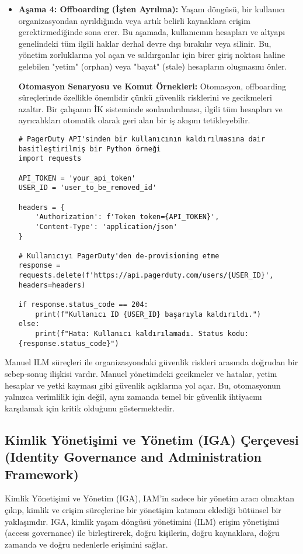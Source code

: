 \begin{itemize}
    \item \textbf{Aşama 4: Offboarding (İşten Ayrılma):} Yaşam döngüsü, bir kullanıcı organizasyondan ayrıldığında veya artık belirli kaynaklara erişim gerektirmediğinde sona erer. Bu aşamada, kullanıcının hesapları ve altyapı genelindeki tüm ilgili haklar derhal devre dışı bırakılır veya silinir. Bu, yönetim zorluklarına yol açan ve saldırganlar için birer giriş noktası haline gelebilen "yetim" (orphan) veya "bayat" (stale) hesapların oluşmasını önler.

    \textbf{Otomasyon Senaryosu ve Komut Örnekleri:} Otomasyon, offboarding süreçlerinde özellikle önemlidir çünkü güvenlik risklerini ve gecikmeleri azaltır. Bir çalışanın İK sisteminde sonlandırılması, ilgili tüm hesapları ve ayrıcalıkları otomatik olarak geri alan bir iş akışını tetikleyebilir.
\begin{verbatim}
# PagerDuty API'sinden bir kullanıcının kaldırılmasına dair basitleştirilmiş bir Python örneği
import requests

API_TOKEN = 'your_api_token'
USER_ID = 'user_to_be_removed_id'

headers = {
    'Authorization': f'Token token={API_TOKEN}',
    'Content-Type': 'application/json'
}

# Kullanıcıyı PagerDuty'den de-provisioning etme
response = requests.delete(f'https://api.pagerduty.com/users/{USER_ID}', headers=headers)

if response.status_code == 204:
    print(f"Kullanıcı ID {USER_ID} başarıyla kaldırıldı.")
else:
    print(f"Hata: Kullanıcı kaldırılamadı. Status kodu: {response.status_code}")
\end{verbatim}
\end{itemize}

Manuel ILM süreçleri ile organizasyondaki güvenlik riskleri arasında doğrudan bir sebep-sonuç ilişkisi vardır. Manuel yönetimdeki gecikmeler ve hatalar, yetim hesaplar ve yetki kayması gibi güvenlik açıklarına yol açar. Bu, otomasyonun yalnızca verimlilik için değil, aynı zamanda temel bir güvenlik ihtiyacını karşılamak için kritik olduğunu göstermektedir.

\subsection{Kimlik Yönetişimi ve Yönetim (IGA) Çerçevesi (Identity Governance and Administration Framework)}

Kimlik Yönetişimi ve Yönetim (IGA), IAM'in sadece bir yönetim aracı olmaktan çıkıp, kimlik ve erişim süreçlerine bir yönetişim katmanı eklediği bütünsel bir yaklaşımdır. IGA, kimlik yaşam döngüsü yönetimini (ILM) erişim yönetişimi (access governance) ile birleştirerek, doğru kişilerin, doğru kaynaklara, doğru zamanda ve doğru nedenlerle erişimini sağlar.

